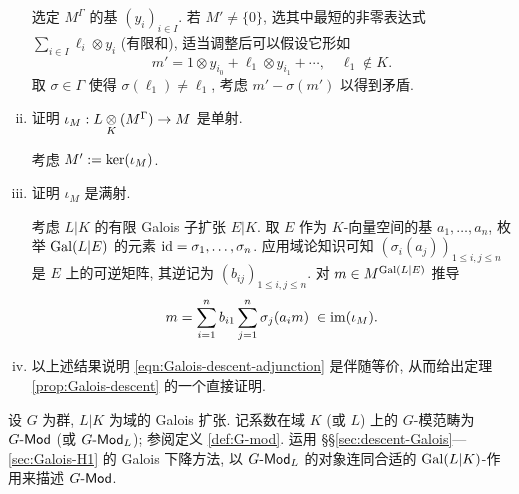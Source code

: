 \begin{Exercises}
\begin{enumerate}[(i)]
		\begin{hint}
			选定 $M^\Gamma$ 的基 $(y_i)_{i \in I}$. 若 $M' \neq \{0\}$, 选其中最短的非零表达式 $\sum_{i \in I} \ell_i \otimes y_i$ (有限和), 适当调整后可以假设它形如
			\[ m' = 1 \otimes y_{i_0} + \ell_1 \otimes y_{i_1} + \cdots, \quad \ell_1 \notin K. \]
			取 $\sigma \in \Gamma$ 使得 $\sigma(\ell_1) \neq \ell_1$, 考虑 $m' - \sigma(m')$ 以得到矛盾.
		\end{hint}
		\item 证明 $\iota_M: L \underset{K}{\otimes} (M^\Gamma) \to M$ 是单射.
		\begin{hint}
			考虑 $M' := \operatorname{ker}(\iota_M)$.
		\end{hint}
		
		\item 证明 $\iota_M$ 是满射.
		
		\begin{hint}
			考虑 $L|K$ 的有限 Galois 子扩张 $E|K$. 取 $E$ 作为 $K$-向量空间的基 $a_1, \ldots, a_n$, 枚举 $\operatorname{Gal}(L|E)$ 的元素 $\mathrm{id} = \sigma_1, \ldots, \sigma_n$. 应用域论知识可知 $(\sigma_i(a_j))_{1 \leq i, j \leq n}$ 是 $E$ 上的可逆矩阵, 其逆记为 $(b_{ij})_{1 \leq i, j \leq n}$. 对 $m \in M^{\operatorname{Gal}(L|E)}$ 推导
			\[ m = \sum_{i=1}^n b_{i1} \sum_{j=1}^n \sigma_j(a_i m) \; \in \operatorname{im}(\iota_M). \] 
		\end{hint}
		
		\item 以上述结果说明 \eqref{eqn:Galois-descent-adjunction} 是伴随等价, 从而给出定理 \ref{prop:Galois-descent} 的一个直接证明.
	\end{enumerate}
	
	\item 设 $G$ 为群, $L|K$ 为域的 Galois 扩张. 记系数在域 $K$ (或 $L$) 上的 $G$-模范畴为 $G\text{-}\mathsf{Mod}$ (或 $G\text{-}\mathsf{Mod}_L$); 参阅定义 \ref{def:G-mod}. 运用 \S\S\ref{sec:descent-Galois}---\ref{sec:Galois-H1} 的 Galois 下降方法, 以 $G\text{-}\mathsf{Mod}_L$ 的对象连同合适的 $\operatorname{Gal}(L|K)$-作用来描述 $G\text{-}\mathsf{Mod}$.
	

\end{Exercises}
